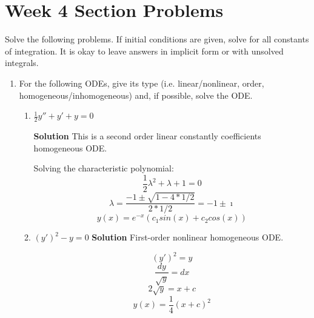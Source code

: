\documentclass[letterpaper, fontsize=11pt]{scrartcl} %
\numberwithin{equation}{section} %
\numberwithin{figure}{section} %
\numberwithin{table}{section} %
\begin{document}

\newcommand{\horrule}[1]{\rule{\linewidth}{#1}} %


\section*{Week 4 Section Problems}
\par Solve the following problems. If initial conditions are given, solve for all constants of integration. It is okay to leave answers in implicit form or with unsolved integrals. 

\begin{enumerate}

\item For the following ODEs, give its type (i.e. linear/nonlinear, order, homogeneous/inhomogeneous) and, if possible, solve the ODE.
\begin{enumerate}
\item $\frac{1}{2}y'' + y' + y = 0$ \par
\textbf{Solution} \newline
This is a second order linear constantly coefficients homogeneous ODE. \par 
Solving the characteristic polynomial:
$$\frac{1}{2}\lambda ^2 + \lambda + 1 = 0 $$
$$ \lambda = \frac{-1 \pm \sqrt{1 - 4*1/2}}{2*1/2} =  -1 \pm \imath$$
$$y(x) = e^{-x}(c_1 sin(x) + c_2 cos(x))$$

\item $(y')^2 - y = 0$ \newline
\textbf{Solution} \newline
First-order nonlinear homogeneous ODE. \par
$$ (y')^2 = y$$
$$\frac{dy}{\sqrt{y}} = dx$$
$$2\sqrt{y} = x + c$$
$$y(x) = \frac{1}{4}(x + c)^2$$


\end{enumerate}
\end{enumerate}
\end{document}
